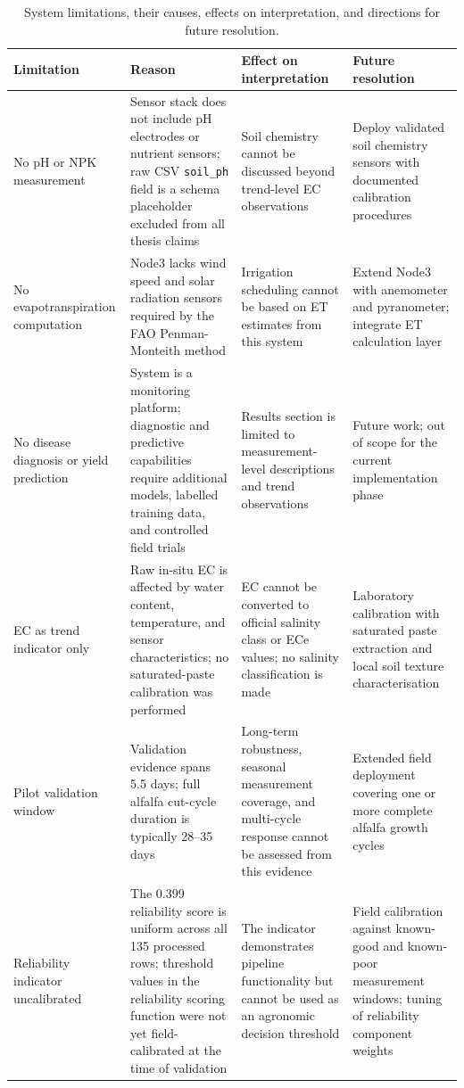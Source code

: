 \begin{table}[H]
\centering
\caption{System limitations, their causes, effects on interpretation, and directions for future resolution.}
\label{tab:system-limitations}
\small
\begin{tabular}{p{3.0cm} p{3.5cm} p{3.5cm} p{3.5cm}}
\hline
\textbf{Limitation} & \textbf{Reason} & \textbf{Effect on interpretation} & \textbf{Future resolution} \\
\hline
No pH or NPK measurement & Sensor stack does not include pH electrodes or nutrient sensors; raw CSV \texttt{soil\_ph} field is a schema placeholder excluded from all thesis claims & Soil chemistry cannot be discussed beyond trend-level EC observations & Deploy validated soil chemistry sensors with documented calibration procedures \\
\hline
No evapotranspiration computation & Node3 lacks wind speed and solar radiation sensors required by the FAO Penman-Monteith method & Irrigation scheduling cannot be based on ET estimates from this system & Extend Node3 with anemometer and pyranometer; integrate ET calculation layer \\
\hline
No disease diagnosis or yield prediction & System is a monitoring platform; diagnostic and predictive capabilities require additional models, labelled training data, and controlled field trials & Results section is limited to measurement-level descriptions and trend observations & Future work; out of scope for the current implementation phase \\
\hline
EC as trend indicator only & Raw in-situ EC is affected by water content, temperature, and sensor characteristics; no saturated-paste calibration was performed & EC cannot be converted to official salinity class or ECe values; no salinity classification is made & Laboratory calibration with saturated paste extraction and local soil texture characterisation \\
\hline
Pilot validation window & Validation evidence spans 5.5 days; full alfalfa cut-cycle duration is typically 28–35 days & Long-term robustness, seasonal measurement coverage, and multi-cycle response cannot be assessed from this evidence & Extended field deployment covering one or more complete alfalfa growth cycles \\
\hline
Reliability indicator uncalibrated & The 0.399 reliability score is uniform across all 135 processed rows; threshold values in the reliability scoring function were not yet field-calibrated at the time of validation & The indicator demonstrates pipeline functionality but cannot be used as an agronomic decision threshold & Field calibration against known-good and known-poor measurement windows; tuning of reliability component weights \\

\end{tabular}
\end{table}
